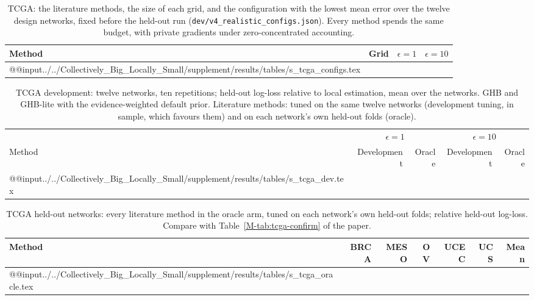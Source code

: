 \documentclass[acmsmall,screen,nonacm]{acmart}
\theoremstyle{acmdefinition}
\begin{document}
\begin{table}[t]
\caption{TCGA: the literature methods, the size of each grid, and the configuration with the lowest mean error over the twelve design networks, fixed before the held-out run (\texttt{dev/v4\_realistic\_configs.json}). Every method spends the same budget, with private gradients under zero-concentrated accounting.}
\label{tab:tcga-configs}
\scriptsize
\begin{tabularx}{\linewidth}{@{}lr>{\raggedright\arraybackslash}X>{\raggedright\arraybackslash}X@{}}
\toprule
Method & Grid & $\epsilon=1$ & $\epsilon=10$\\
\midrule
\csname @@input\endcsname../../Collectively_Big_Locally_Small/supplement/results/tables/s_tcga_configs.tex 
\bottomrule
\end{tabularx}
\end{table}

\begin{table}[t]
\caption{TCGA development: twelve networks, ten repetitions; held-out log-loss relative to local estimation, mean over the networks. GHB and GHB-lite with the evidence-weighted default prior. Literature methods: tuned on the same twelve networks (development tuning, in sample, which favours them) and on each network's own held-out folds (oracle).}
\label{tab:tcga-dev}
\scriptsize
\begin{tabular}{@{}lrrrr@{}}
\toprule
 & \multicolumn{2}{c}{$\epsilon=1$} & \multicolumn{2}{c}{$\epsilon=10$}\\
\cmidrule(lr){2-3}\cmidrule(l){4-5}
Method & Development & Oracle & Development & Oracle\\
\midrule
\csname @@input\endcsname../../Collectively_Big_Locally_Small/supplement/results/tables/s_tcga_dev.tex 
\bottomrule
\end{tabular}
\end{table}

\begin{table}[t]
\caption{TCGA held-out networks: every literature method in the oracle arm, tuned on each network's own held-out folds; relative held-out log-loss. Compare with Table~\ref{M-tab:tcga-confirm} of the paper.}
\label{tab:tcga-oracle}
\scriptsize
\begin{tabular}{@{}lrrrrrr@{}}
\toprule
Method & BRCA & MESO & OV & UCEC & UCS & Mean\\
\midrule
\csname @@input\endcsname../../Collectively_Big_Locally_Small/supplement/results/tables/s_tcga_oracle.tex 
\bottomrule
\end{tabular}
\end{table}
\end{document}
